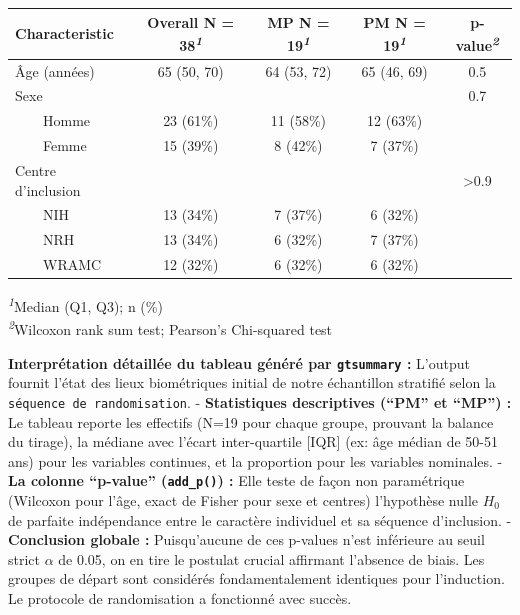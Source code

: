 \documentclass[
  letterpaper,
  DIV=11,
  numbers=noendperiod]{scrartcl}
\begin{document}
\begin{table}
\fontsize{12.0pt}{14.0pt}\selectfont
\begin{tabular*}{\linewidth}{@{\extracolsep{\fill}}lcccc}
\toprule
\textbf{Characteristic} & \textbf{Overall}  N = 38\textsuperscript{\textit{1}} & \textbf{MP}  N = 19\textsuperscript{\textit{1}} & \textbf{PM}  N = 19\textsuperscript{\textit{1}} & \textbf{p-value}\textsuperscript{\textit{2}} \\ 
\midrule\addlinespace[2.5pt]
Âge (années) & 65 (50, 70) & 64 (53, 72) & 65 (46, 69) & 0.5 \\ 
Sexe &  &  &  & 0.7 \\ 
    Homme & 23 (61\%) & 11 (58\%) & 12 (63\%) &  \\ 
    Femme & 15 (39\%) & 8 (42\%) & 7 (37\%) &  \\ 
Centre d'inclusion &  &  &  & >0.9 \\ 
    NIH & 13 (34\%) & 7 (37\%) & 6 (32\%) &  \\ 
    NRH & 13 (34\%) & 6 (32\%) & 7 (37\%) &  \\ 
    WRAMC & 12 (32\%) & 6 (32\%) & 6 (32\%) &  \\ 
\bottomrule
\end{tabular*}
\begin{minipage}{\linewidth}
\vspace{.05em}
\textsuperscript{\textit{1}}Median (Q1, Q3); n (\%)\\
\textsuperscript{\textit{2}}Wilcoxon rank sum test; Pearson's Chi-squared test\\
\end{minipage}
\end{table}

\textbf{Interprétation détaillée du tableau généré par
\texttt{gtsummary} :} L'output fournit l'état des lieux biométriques
initial de notre échantillon stratifié selon la
\texttt{séquence\ de\ randomisation}. - \textbf{Statistiques
descriptives (``PM'' et ``MP'') :} Le tableau reporte les effectifs
(N=19 pour chaque groupe, prouvant la balance du tirage), la médiane
avec l'écart inter-quartile {[}IQR{]} (ex: âge médian de 50-51 ans) pour
les variables continues, et la proportion pour les variables nominales.
- \textbf{La colonne ``p-value'' (\texttt{add\_p()}) :} Elle teste de
façon non paramétrique (Wilcoxon pour l'âge, exact de Fisher pour sexe
et centres) l'hypothèse nulle \(H_0\) de parfaite indépendance entre le
caractère individuel et sa séquence d'inclusion. - \textbf{Conclusion
globale :} Puisqu'aucune de ces p-values n'est inférieure au seuil
strict \(\alpha\) de 0.05, on en tire le postulat crucial affirmant
l'absence de biais. Les groupes de départ sont considérés
fondamentalement identiques pour l'induction. Le protocole de
randomisation a fonctionné avec succès.
\end{document}
